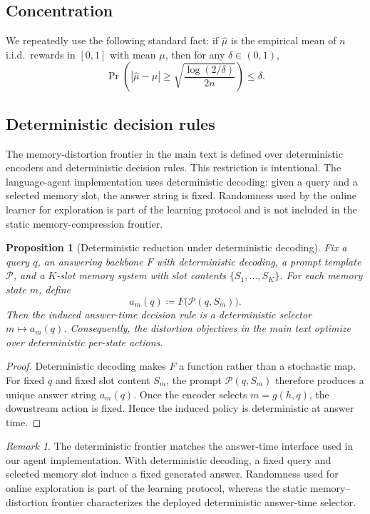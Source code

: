 \documentclass{article}
\theoremstyle{plain}
\newtheorem{proposition}{Proposition}
\theoremstyle{definition}
\theoremstyle{remark}
\newtheorem{remark}{Remark}
\begin{document}
\subsection{Concentration}
\label{app:concentration}
We repeatedly use the following standard fact:
if $\hat\mu$ is the empirical mean of $n$ i.i.d.\ rewards in $[0,1]$ with mean $\mu$, then for any $\delta\in(0,1)$,
\begin{equation}
\label{eq:hoeffding}
\Pr\!\left(
|\hat\mu-\mu|
\ge
\sqrt{\frac{\log(2/\delta)}{2n}}
\right)
\le \delta.
\end{equation}

\subsection{Deterministic decision rules}
\label{app:deterministic}

The memory-distortion frontier in the main text is defined over
deterministic encoders and deterministic decision rules. This restriction is
intentional. The language-agent implementation uses deterministic decoding:
given a query and a selected memory slot, the answer string is fixed.
Randomness used by the online learner for exploration is part of the
learning protocol and is not included in the static memory-compression
frontier.

\begin{proposition}[Deterministic reduction under deterministic decoding]
\label{prop:deterministic}
Fix a query \(q\), an answering backbone \(F\) with deterministic decoding,
a prompt template \(\mathcal P\), and a \(K\)-slot memory system with slot
contents \(\{S_1,\dots,S_K\}\). For each memory state \(m\), define
\[
a_m(q) \coloneqq F\bigl(\mathcal P(q,S_m)\bigr).
\]
Then the induced answer-time decision rule is a deterministic selector
\(m\mapsto a_m(q)\). Consequently, the distortion objectives in the main
text optimize over deterministic per-state actions.
\end{proposition}

\begin{proof}
Deterministic decoding makes \(F\) a function rather than a stochastic map.
For fixed \(q\) and fixed slot content \(S_m\), the prompt
\(\mathcal P(q,S_m)\) therefore produces a unique answer string
\(a_m(q)\). Once the encoder selects \(m=g(h,q)\), the downstream action is
fixed. Hence the induced policy is deterministic at answer time.
\end{proof}

\begin{remark}
The deterministic frontier matches the answer-time interface used in our agent
implementation. With deterministic decoding, a fixed query and selected memory
slot induce a fixed generated answer. Randomness used for online exploration is
part of the learning protocol, whereas the static memory--distortion frontier
characterizes the deployed deterministic answer-time selector.
\end{remark}
\end{document}

